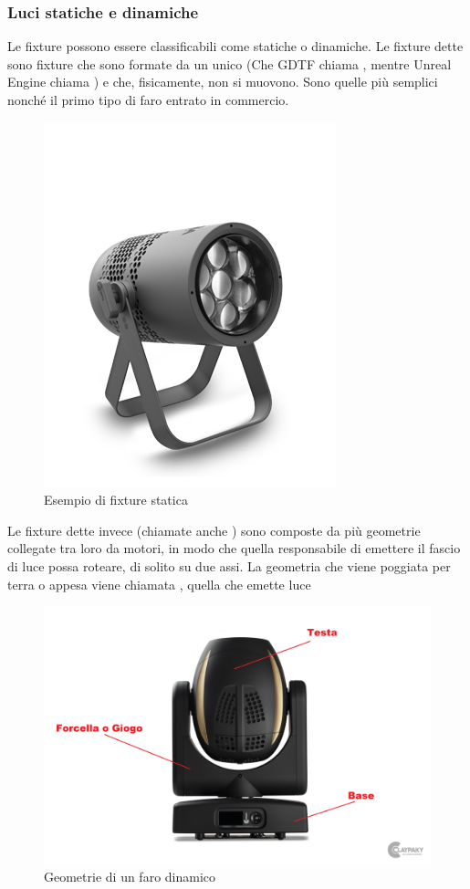 \documentclass[main.tex]{subfiles}
\begin{document}
\subsubsection{Luci statiche e dinamiche}\label{subsec:1_1_fixtureTypes}
Le fixture possono essere classificabili come statiche o dinamiche. Le fixture dette  sono fixture che sono formate da un unico  (Che GDTF chiama , mentre Unreal Engine chiama ) e che, fisicamente, non si muovono. Sono quelle più semplici nonché il primo tipo di faro entrato in commercio.
\begin{figure}[H]
    \centering
    \includegraphics[width=0.4\linewidth]{img/introduzione/staticFixtureExample.jpg}
    \caption{Esempio di fixture statica}
    \label{fig:1_staticFixture}
\end{figure}
Le fixture dette invece  (chiamate anche ) sono composte da più geometrie collegate tra loro da motori, in modo che quella responsabile di emettere il fascio di luce possa roteare, di solito su due assi. La geometria che viene poggiata per terra o appesa viene chiamata , quella che emette luce 
\begin{figure}[H]
    \centering
    \includegraphics[width=0.75\linewidth]{img/introduzione/dynamicFixtureAnatomy.jpg}
    \caption{Geometrie di un faro dinamico}
    \label{fig:1_DynamicFixture}
\end{figure}
\end{document}

